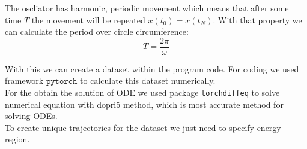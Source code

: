 The oscliator has harmonic, periodic movement which means that after some time $T$ the movement will be repeated $x(t_0) = x(t_N)$. With that property we can calculate the period over circle circumference:
\begin{equation}
	T = \frac{2\pi}{\omega}
\end{equation}

With this we can create a dataset within the program code. For coding we used framework $\texttt{pytorch}$ to calculate this dataset numerically.\\
For the obtain the solution of ODE we used package \texttt{torchdiffeq}\cite{torchdiffeq} to solve numerical equation with dopri5 method, which is most accurate method for solving ODEs.\\
To create unique trajectories for the dataset we just need to specify energy region.


